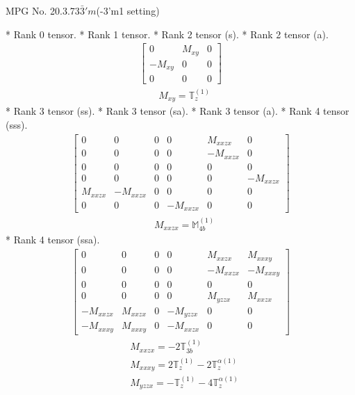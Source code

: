 \documentclass[fleqn,8pt,landscape]{jsarticle}
\begin{document}
\setcounter{MaxMatrixCols}{32}

\renewcommand{\tablename}{Table~}
\renewcommand{\figurename}{Figure~}
\begin{center}
\LARGE
MPG No. 20.3.73\quad$\bar{3}'m$\quad(-3'm1 setting)
\end{center}
* Rank 0 tensor.
* Rank 1 tensor.
* Rank 2 tensor (s).
* Rank 2 tensor (a).
\begin{align*}
\begin{bmatrix} 0 & M_{xy} & 0 \\ - M_{xy} & 0 & 0 \\ 0 & 0 & 0 \end{bmatrix}
\end{align*}
\begin{align*}
& M_{xy} = \mathbb{T}_{z}^{(1)}
\end{align*}
* Rank 3 tensor (ss).
* Rank 3 tensor (sa).
* Rank 3 tensor (a).
* Rank 4 tensor (sss).
\begin{align*}
\begin{bmatrix} 0 & 0 & 0 & 0 & M_{xxzx} & 0 \\ 0 & 0 & 0 & 0 & - M_{xxzx} & 0 \\ 0 & 0 & 0 & 0 & 0 & 0 \\ 0 & 0 & 0 & 0 & 0 & - M_{xxzx} \\ M_{xxzx} & - M_{xxzx} & 0 & 0 & 0 & 0 \\ 0 & 0 & 0 & - M_{xxzx} & 0 & 0 \end{bmatrix}
\end{align*}
\begin{align*}
& M_{xxzx} = \mathbb{M}_{4b}^{(1)}
\end{align*}
* Rank 4 tensor (ssa).
\begin{align*}
\begin{bmatrix} 0 & 0 & 0 & 0 & M_{xxzx} & M_{xxxy} \\ 0 & 0 & 0 & 0 & - M_{xxzx} & - M_{xxxy} \\ 0 & 0 & 0 & 0 & 0 & 0 \\ 0 & 0 & 0 & 0 & M_{yzzx} & M_{xxzx} \\ - M_{xxzx} & M_{xxzx} & 0 & - M_{yzzx} & 0 & 0 \\ - M_{xxxy} & M_{xxxy} & 0 & - M_{xxzx} & 0 & 0 \end{bmatrix}
\end{align*}
\begin{align*}
& M_{xxzx} = - 2 \mathbb{T}_{3b}^{(1)} \\
& M_{xxxy} = 2 \mathbb{T}_{z}^{(1)} - 2 \mathbb{T}_{z}^{\alpha(1)} \\
& M_{yzzx} = - \mathbb{T}_{z}^{(1)} - 4 \mathbb{T}_{z}^{\alpha(1)}
\end{align*}
\end{document}
